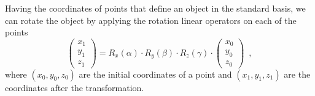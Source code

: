 \documentclass[12pt]{article}
\begin{document}
Having the coordinates of points that define an object in the standard basis, we can rotate the object by applying the rotation linear operators on each of the points
\begin{equation*}
	\begin{pmatrix}
		x_1 \\
		y_1 \\
		z_1 
	\end{pmatrix}
	= R_x(\alpha) \cdot R_y(\beta) \cdot R_z(\gamma) \cdot
	\begin{pmatrix}
		x_0 \\
		y_0 \\
		z_0 
	\end{pmatrix}
	\enspace ,
\end{equation*}
where $(x_0 , y_0 , z_0)$ are the initial coordinates of a point and $(x_1 , y_1 , z_1)$ are the coordinates after the transformation.
\end{document}
